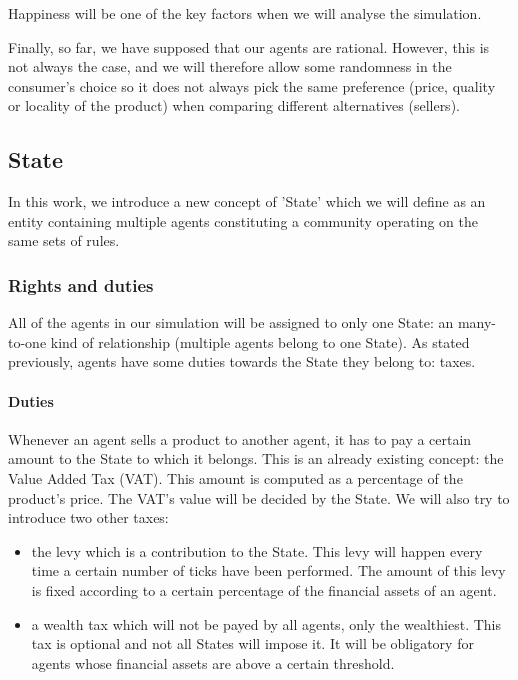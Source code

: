 \documentclass[12pt]{article}
\begin{document}
Happiness will be one of the key factors when we will analyse the simulation.

Finally, so far, we have supposed that our agents are rational. However, this is not always the case, and we will therefore allow some randomness in the consumer's choice so it does not always pick the same preference (price, quality or locality of the product) when comparing different alternatives (sellers).

\subsection{State}\label{section:state}
In this work, we introduce a new concept of 'State' which we will define as an entity containing multiple agents constituting a community operating on the same sets of rules.

\subsubsection{Rights and duties}
All of the agents in our simulation will be assigned to only one State: an many-to-one kind of relationship (multiple agents belong to one State). As stated previously, agents have some duties towards the State they belong to: taxes.

\paragraph{Duties}
Whenever an agent sells a product to another agent, it has to pay a certain amount to the State to which it belongs. This is an already existing concept: the Value Added Tax (VAT). This amount is computed as a percentage of the product's price. The VAT's value will be decided by the State. We will also try to introduce two other taxes:

\begin{itemize}
    \item the levy which is a contribution to the State. This levy will happen every time a certain number of ticks have been performed. The amount of this levy is fixed according to a certain percentage of the financial assets of an agent.
    \item a wealth tax which will not be payed by all agents, only the wealthiest. This tax is optional and not all States will impose it. It will be obligatory for agents whose financial assets are above a certain threshold.
\end{itemize}
\end{document}
